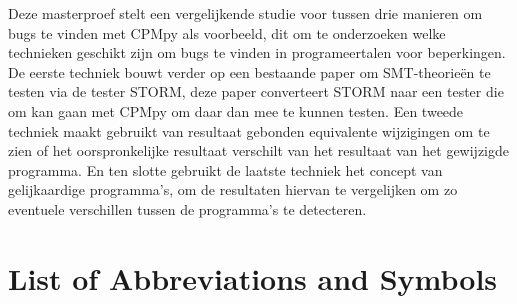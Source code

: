 \documentclass[master=cws,masteroption=se,english]{kulemt} %
\begin{document}
\begin{abstract*}
%
Deze masterproef stelt een vergelijkende studie voor tussen drie manieren om bugs te vinden met CPMpy als voorbeeld, dit om te onderzoeken welke technieken geschikt zijn om bugs te vinden in programeertalen voor beperkingen.
De eerste techniek bouwt verder op een bestaande paper om SMT-theorieën te testen via de tester STORM, deze paper converteert STORM naar een tester die om kan gaan met CPMpy om daar dan mee te kunnen testen.
Een tweede techniek maakt gebruikt van resultaat gebonden equivalente wijzigingen om te zien of het oorspronkelijke resultaat verschilt van het resultaat van het gewijzigde programma. En ten slotte gebruikt de laatste techniek het concept van gelijkaardige programma's, om de resultaten hiervan te vergelijken om zo eventuele verschillen tussen de programma's te detecteren.


\end{abstract*}

\listoffiguresandtables
\lstlistoflistings
\chapter{List of Abbreviations and Symbols}
\end{document}
